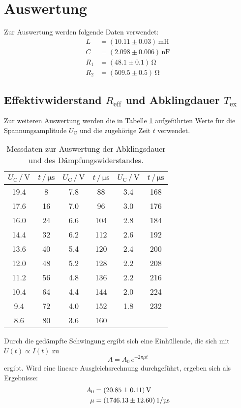 \section{Auswertung}
Zur Auswertung werden folgende Daten verwendet:
\begin{align*}
  L &= (10.11\pm0.03)\,\si{\milli\henry} \\
  C &= (2.098\pm0.006)\,\si{\nano\farad} \\
  R_\text{1} &= (48.1\pm0.1)\,\si{\ohm}\\
  R_\text{2} &= (509.5\pm0.5)\,\si{\ohm}
\end{align*}
\subsection{Effektivwiderstand $R_\text{eff}$ und Abklingdauer $T_\text{ex}$}
Zur weiteren Auswertung werden die in Tabelle \ref{tab:amptime} aufgeführten Werte für die Spannungsamplitude $U_\text{C}$ und die zugehörige Zeit $t$ verwendet.
\begin{table}[!h]
  \centering
  \caption{Messdaten zur Auswertung der Abklingsdauer und des Dämpfungswiderstandes.}
  \begin{tabular}{cc||cc||cc}
    \toprule
    {$U_\text{C}\,/\,\si{\volt}$} & {$t\,/\,\si{\micro\second}$} & {$U_\text{C}\,/\,\si{\volt}$} & {$t\,/\,\si{\micro\second}$} &
    {$U_\text{C}\,/\,\si{\volt}$} & {$t\,/\,\si{\micro\second}$} \\
    \midrule
    19.4 & 8   & 7.8 & 88  & 3.4 & 168 \\
    17.6 & 16  & 7.0 & 96  & 3.0 & 176 \\
    16.0 & 24  & 6.6 & 104 & 2.8 & 184 \\
    14.4 & 32  & 6.2 & 112 & 2.6 & 192 \\
    13.6 & 40  & 5.4 & 120 & 2.4 & 200 \\
    12.0 & 48  & 5.2 & 128 & 2.2 & 208 \\
    11.2 & 56  & 4.8 & 136 & 2.2 & 216 \\
    10.4 & 64  & 4.4 & 144 & 2.0 & 224 \\
    9.4  & 72  & 4.0 & 152 & 1.8 & 232 \\
    8.6  & 80  & 3.6 & 160 &     &     \\
    \bottomrule
  \end{tabular}
  \label{tab:amptime}
\end{table}


Durch die gedämpfte Schwingung ergibt sich eine Einhüllende, die sich mit $U(t) \propto I(t)$ zu
\begin{equation}
  A = A_\text{0}\,e^{-2\pi\mu t}
\end{equation}
ergibt. Wird eine lineare Ausgleichsrechnung durchgeführt, ergeben sich als Ergebnisse:
\begin{align*}
  A_\text{0} &= (20.85 \pm 0.11)\,\si{\volt}\\
  \mu &= (1746.13 \pm 12.60)\,\si[per-mode=symbol]{\per\micro\second}
\end{align*}


